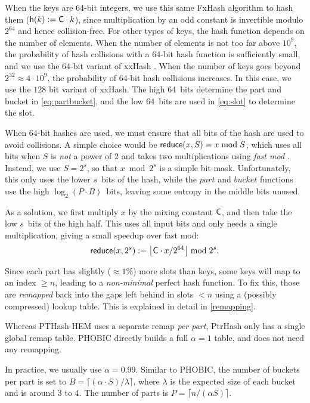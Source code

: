 \documentclass[a4paper,UKenglish,cleveref,thm-restate]{lipics-v2021}
\begin{document}
When the keys are 64-bit integers, we use this same FxHash algorithm to hash
them (\(\mathsf{h}(k) := \mathsf{C}\cdot k\)), since multiplication by an odd constant is invertible modulo \(2^{64}\) and
hence collision-free.
For other types of keys, the hash function depends on the number of elements. When the
number of elements is not too far above \(10^9\), the probability of hash
collisions with a 64-bit hash function is sufficiently small, and we use
the 64-bit variant of xxHash \cite{xxhash,xxhash-rust}.
When the number of keys goes beyond \(2^{32} \approx 4\cdot 10^9\), the
probability of 64-bit hash collisions increases. In this case, we use the
\(128\) bit variant of xxHash.
The high 64~bits determine the part and bucket in \cref{eq:partbucket}, and the low
64~bits are used in \cref{eq:slot} to determine the slot.

 When 64-bit hashes are used, we must ensure that all bits of
the hash are used to avoid collisions. A simple choice would be \(\mathsf{reduce}(x,S) = x\bmod S\), which uses
all bits when \(S\) is \emph{not} a power of \(2\) and takes two multiplications using
\emph{fast mod} \cite{fast-mod}. Instead, we use \(S=2^s\), so that \(x\bmod 2^s\) is a simple bit-mask. Unfortunately, this only uses
the lower \(s\)~bits of the hash, while the \(part\) and \(bucket\) functions use the
high \(\log_2(P\cdot B)\)~bits, leaving some entropy in the middle bits unused.

As a solution, we first multiply \(x\) by the mixing constant \(\mathsf{C}\), and then take the low
\(s\)~bits of the high half. This uses all input bits and
only needs a single multiplication, giving a small speedup over fast mod:
\begin{equation}
  \mathsf{reduce}(x, 2^s) := \left\lfloor \mathsf{C}\cdot x/2^{64}\right\rfloor \bmod 2^s.
\end{equation}

 Since each part has slightly (\(\approx 1\%\)) more slots than keys, some keys will map to an
index \(\geq n\), leading to a \emph{non-minimal} perfect hash function. To fix this,
those are \emph{remapped} back into the gaps left behind in slots \(<n\) using a
(possibly compressed) lookup table. This is explained in detail in \cref{remapping}.

Whereas PTHash-HEM uses a separate remap \emph{per part}, PtrHash only has a single
global remap table. PHOBIC directly builds a full \(\alpha=1\) table, and does
not need any remapping.

In practice, we usually use \(\alpha=0.99\).
Similar to PHOBIC, the number of buckets per part is set to \(B = \lceil(\alpha\cdot
S)/\lambda\rceil\), where \(\lambda\) is the expected size of each bucket and is around
\(3\) to \(4\).
The number of parts is \(P=\lceil n/(\alpha S)\rceil\).
\end{document}
